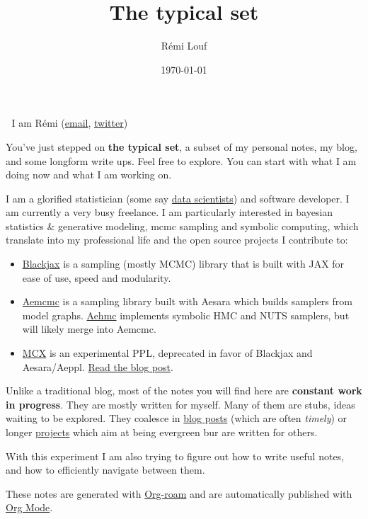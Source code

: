 \documentclass[11pt]{article}
\author{Rémi Louf}
\date{\today}
\title{The typical set}
\begin{document}
\maketitle
\tableofcontents

👋 I am Rémi (\href{mailto:remi@thetypicalset.com}{email}, \href{https://twitter.com/remilouf}{twitter})

You've just stepped on \textbf{the typical set}, a subset of my personal notes, my blog, and some longform write ups. Feel
free to explore. You can start with what I am doing now and what I am working
on.

I am a glorified statistician (some say \href{https://hbr.org/2012/10/data-scientist-the-sexiest-job-of-the-21st-century}{data scientists}) and software developer. I am currently a very busy freelance. I am particularly interested in bayesian statistics \& generative modeling, mcmc sampling and symbolic computing, which translate into my professional life and the open source projects I contribute to:

\begin{itemize}
\item \href{https://github.com/blackjax-devs/blackjax}{Blackjax} is a sampling (mostly MCMC) library that is built with JAX for ease of use, speed and modularity.
\item \href{https://github.com/aesara-devs/aemcmc}{Aemcmc} is a sampling library built with Aesara which builds samplers from model graphs. \href{https://github.com/aesara-devs/aehmc}{Aehmc}
implements symbolic HMC and NUTS samplers, but will likely merge into Aemcmc.
\item \href{https://github.com/rlouf/mcx}{MCX} is an experimental PPL, deprecated in favor of Blackjax and Aesara/Aeppl. \href{blog/introducing-mcx.org}{Read the blog post}.
\end{itemize}


Unlike a traditional blog, most of the notes you will find here are \textbf{constant
work in progress}. They are mostly written for myself. Many of them are stubs,
ideas waiting to be explored. They coalesce in \href{blog/index.org}{blog posts} (which are often
\emph{timely}) or longer \href{file:///home/remi/projects/blog/.dir-locals.el}{projects} which aim at being evergreen bur are written for others.

With this experiment I am also trying to figure out how to write useful notes, and how to
efficiently navigate between them.

These notes are generated with \href{https://www.orgroam.com/}{Org-roam} and are automatically published with \href{https://www.orgmode.org/fr/}{Org Mode}.
\end{document}
